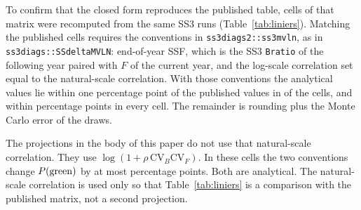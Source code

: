 \documentclass[11pt,a4paper]{article}
\begin{document}
To confirm that the closed form reproduces the published table, \linCells{}
cells of that matrix were recomputed from the same SS3 runs
(Table~\ref{tab:liniers}). Matching the published cells requires the
conventions in \texttt{ss3diags2::ss3mvln}, as in
\texttt{ss3diags::SSdeltaMVLN}: end-of-year SSF, which is the SS3
\texttt{Bratio} of the following year paired with $F$ of the current year,
and the log-scale correlation set equal to the natural-scale correlation.
With those conventions the analytical values lie within one percentage point
of the published values in \linWithinOne{} of the \linCells{} cells, and
within \linMaxRounded{} percentage points in every cell. The remainder is
rounding plus the Monte Carlo error of the \linN{} draws.

The projections in the body of this paper do not use that natural-scale
correlation. They use $\log(1 + \rho\,\mathrm{CV}_B\mathrm{CV}_F)$. In these
cells the two conventions change $P(\mathrm{green})$ by at most \trDiff{} percentage
points. Both are analytical. The natural-scale correlation is used only so
that Table~\ref{tab:liniers} is a comparison with the published matrix, not
a second projection.





\end{document}
